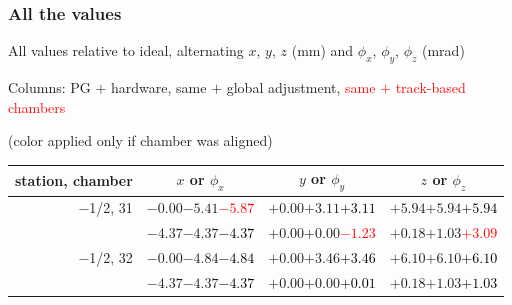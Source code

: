 \documentclass[compress]{beamer}
\begin{document}
\begin{frame}
\frametitle{All the values}
\tiny

All values relative to ideal, alternating $x$, $y$, $z$ (mm) and $\phi_x$, $\phi_y$, $\phi_z$ (mrad)

Columns: PG $+$ hardware, same $+$ global adjustment, \textcolor{red}{same $+$ track-based chambers}

\hfill (color applied only if chamber was aligned)

\vfill
\renewcommand{\arraystretch}{1.1}
\begin{tabular}{r | c | c | c}
station, chamber & $x$ or $\phi_x$ & $y$ or $\phi_y$ & $z$ or $\phi_z$ \\\hline
$-$1/2, 31 & $-0.00$\hspace{0.1 cm}$-5.41$\hspace{0.1 cm}\textcolor{red}{$-5.87$} & $+0.00$\hspace{0.1 cm}$+3.11$\hspace{0.1 cm}\textcolor{black}{$+3.11$} & $+5.94$\hspace{0.1 cm}$+5.94$\hspace{0.1 cm}\textcolor{black}{$+5.94$} \\
           & $-4.37$\hspace{0.1 cm}$-4.37$\hspace{0.1 cm}\textcolor{black}{$-4.37$} & $+0.00$\hspace{0.1 cm}$+0.00$\hspace{0.1 cm}\textcolor{red}{$-1.23$} & $+0.18$\hspace{0.1 cm}$+1.03$\hspace{0.1 cm}\textcolor{red}{$+3.09$} \\
$-$1/2, 32 & $-0.00$\hspace{0.1 cm}$-4.84$\hspace{0.1 cm}\textcolor{black}{$-4.84$} & $+0.00$\hspace{0.1 cm}$+3.46$\hspace{0.1 cm}\textcolor{black}{$+3.46$} & $+6.10$\hspace{0.1 cm}$+6.10$\hspace{0.1 cm}\textcolor{black}{$+6.10$} \\
           & $-4.37$\hspace{0.1 cm}$-4.37$\hspace{0.1 cm}\textcolor{black}{$-4.37$} & $+0.00$\hspace{0.1 cm}$+0.00$\hspace{0.1 cm}\textcolor{black}{$+0.01$} & $+0.18$\hspace{0.1 cm}$+1.03$\hspace{0.1 cm}\textcolor{black}{$+1.03$} \\

\end{tabular}
\end{frame}
\end{document}
